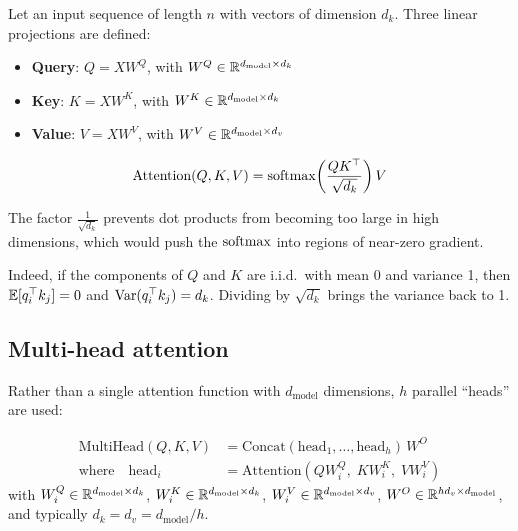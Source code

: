 Let an input sequence of length $n$ with vectors of dimension $d_k$. Three linear projections are defined:
\begin{itemize}
    \item \textbf{Query}: $Q = XW^Q$, with $W^Q \in \mathbb{R}^{d_{\text{model}} \times d_k}$
    \item \textbf{Key}: $K = XW^K$, with $W^K \in \mathbb{R}^{d_{\text{model}} \times d_k}$
    \item \textbf{Value}: $V = XW^V$, with $W^V \in \mathbb{R}^{d_{\text{model}} \times d_v}$
\end{itemize}

\begin{mathbox}[title=\textbf{Scaled Dot-Product Attention}]
\begin{equation}
\text{Attention}(Q, K, V) = \mathrm{softmax}\!\left(\frac{QK^\top}{\sqrt{d_k}}\right) V
\label{eq:scaled-attention-transformer}
\end{equation}
\end{mathbox}

\begin{intuition}
The factor $\frac{1}{\sqrt{d_k}}$ prevents dot products from becoming too large in high dimensions, which would push the $\mathrm{softmax}$ into regions of near-zero gradient.

Indeed, if the components of $Q$ and $K$ are i.i.d.\ with mean 0 and variance 1, then $\mathbb{E}[q_i^\top k_j] = 0$ and $\mathrm{Var}(q_i^\top k_j) = d_k$. Dividing by $\sqrt{d_k}$ brings the variance back to 1.
\end{intuition}

\subsection{Multi-head attention}
\label{sec:multi-head-attention}

Rather than a single attention function with $d_{\text{model}}$ dimensions, $h$ parallel ``heads'' are used:

\begin{keyformulas}[title=\textbf{Multi-head attention}]
\begin{align}
\text{MultiHead}(Q, K, V) &= \text{Concat}(\text{head}_1, \ldots, \text{head}_h)\, W^O \\
\text{where} \quad \text{head}_i &= \text{Attention}(QW_i^Q,\; KW_i^K,\; VW_i^V)
\end{align}
with $W_i^Q \in \mathbb{R}^{d_{\text{model}} \times d_k}$, $W_i^K \in \mathbb{R}^{d_{\text{model}} \times d_k}$, $W_i^V \in \mathbb{R}^{d_{\text{model}} \times d_v}$, $W^O \in \mathbb{R}^{hd_v \times d_{\text{model}}}$, and typically $d_k = d_v = d_{\text{model}} / h$.
\end{keyformulas}


